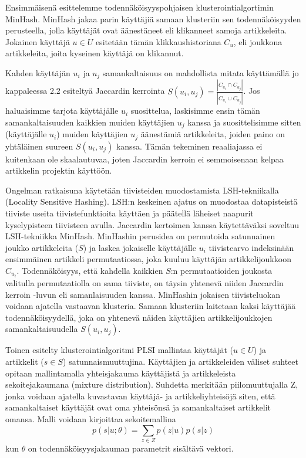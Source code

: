\documentclass[12pt,finnish]{tktltiki2}
\theoremstyle{definition}
\theoremstyle{remark}
\begin{document}
Ensimmäisenä esittelemme todennäköisyyspohjaisen klusterointialgortimin MinHash. MinHash jakaa parin käyttäjiä samaan klusteriin sen todennäköisyyden perusteella, jolla käyttäjät ovat äänestäneet eli klikanneet samoja artikkeleita. Jokainen käyttäjä $u \in U$ esitetään tämän klikkaushistoriana $C_u$, eli joukkona artikkeleita, joita kyseinen käyttäjä on klikannut.

Kahden käyttäjän $u_i$ ja $u_j$ samankaltaisuus on mahdollista mitata käyttämällä jo kappaleessa 2.2 esiteltyä Jaccardin kerrointa $S(u_i, u_j) = \frac{|C_{u_{i}} \cap C_{u_{j}}|}{|C_{u_{i}} \cup C_{u_{j}}|}$. Jos haluaisimme tarjota käyttäjälle $u_i$ suosittelua, laskisimme ensin tämän samankaltaisuuden kaikkien muiden käyttäjien $u_j$ kanssa ja suosittelisimme sitten (käyttäjälle $u_i$) muiden käyttäjien $u_j$ äänestämiä artikkeleita, joiden paino on yhtäläinen suureen $S(u_i, u_j)$ kanssa. Tämän tekeminen reaaliajassa ei kuitenkaan ole skaalautuvaa, joten Jaccardin kerroin ei semmoisenaan kelpaa artikkelin projektin käyttöön.

Ongelman ratkaisuna käytetään tiivisteiden muodostamista LSH-tekniikalla (Locality Sensitive Hashing). LSH:n keskeinen ajatus on muodostaa datapisteistä tiiviste useita tiivistefunktioita käyttäen ja päätellä läheiset naapurit kyselypisteen tiivisteen avulla. Jaccardin kertoimen kanssa käytettäväksi soveltuu LSH-tekniikka MinHash. MinHashin perusidea on permutoida satunnainen joukko artikkeleita ($S$) ja laskea jokaiselle käyttäjälle $u_i$ tiivistearvo indeksinään ensimmäinen artikkeli permutaatiossa, joka kuuluu käyttäjän artikkelijoukkoon $C_{u_{i}}$. Todennäköisyys, että kahdella kaikkien $S$:n permutaatioiden joukosta valitulla permutaatiolla on sama tiiviste, on täysin yhtenevä  niiden Jaccardin kerroin -luvun eli samanlaisuuden kanssa. MinHashin jokaisen tiivisteluokan voidaan ajatella vastaavan klusteria. Samaan klusteriin laitetaan kaksi käyttäjää todennäköisyydellä, joka on yhtenevä näiden käyttäjien artikkelijoukkojen samankaltaisuudella $S(u_i, u_j)$.

Toinen esitelty klusterointialgoritmi PLSI mallintaa käyttäjät ($u \in U$) ja artikkelit ($s \in S$) satunnaismuuttujina.
Käyttäjien ja artikkeleiden väliset suhteet opitaan mallintamalla yhteisjakauma käyttäjistä ja artikkeleista sekoitejakaumana (mixture distribution).
Suhdetta merkitään piilomuuttujalla Z, jonka voidaan ajatella kuvastavan käyttäjä- ja artikkeliyhteisöjä siten, että samankaltaiset käyttäjät ovat oma yhteisönsä ja samankaltaiset artikkelit omansa. Malli voidaan kirjoittaa sekoitemallina
\begin{displaymath}
p(s|u;\theta)= \sum_{z \in Z} {p(z|u)}{p(s|z)}
\end{displaymath}
kun $\theta$ on todennäköisyysjakauman parametrit sisältävä vektori.
\end{document}

